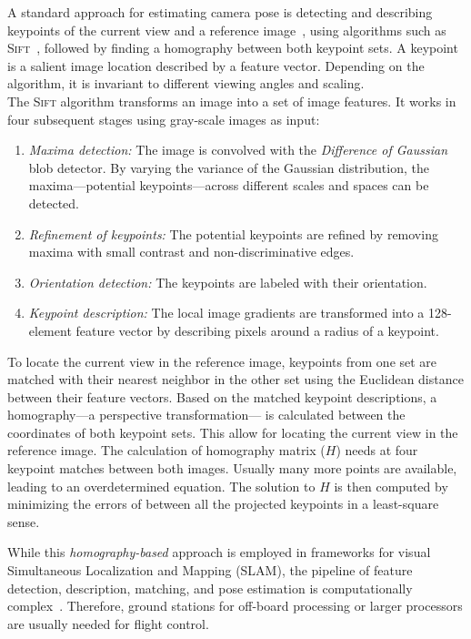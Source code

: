 \documentclass{report}
\begin{document}
A standard approach for estimating camera pose is detecting and
describing keypoints of the current view and a reference
image~\cite{se2002global}, using algorithms such as
\textsc{Sift}~\cite{lowe1999object}, followed by finding a homography
between both keypoint sets. A keypoint is a salient image location
described by a feature vector. Depending on the algorithm, it is
invariant to different viewing angles and scaling.\\
The \textsc{Sift} algorithm transforms an image into a set of image
features. It works in four subsequent stages using gray-scale images
as input:
\begin{enumerate}
\item \emph{Maxima detection:} The image is convolved with the
  \emph{Difference of Gaussian} blob detector. By varying the variance
  of the Gaussian distribution, the maxima---potential
  keypoints---across different scales and spaces can be detected.
\item \emph{Refinement of keypoints:} The potential keypoints are
  refined by removing maxima with small contrast and non-discriminative
  edges.
\item \emph{Orientation detection:} The keypoints are labeled with
  their orientation.
\item \emph{Keypoint description:} The local image gradients are
  transformed into a 128-element feature vector by describing pixels
  around a radius of a keypoint.
\end{enumerate}

To locate the current view in the reference image, keypoints from one
set are matched with their nearest neighbor in the other set using the
Euclidean distance between their feature vectors. Based on the matched
keypoint descriptions, a homography---a perspective transformation---
is calculated between the coordinates of both keypoint sets. This
allow for locating the current view in the reference image. The
calculation of homography matrix ($H$) needs at four keypoint matches
between both images. Usually many more points are available, leading
to an overdetermined equation. The solution to $H$ is then computed by
minimizing the errors of between all the projected keypoints in a
least-square sense.

While this \emph{homography-based} approach is employed in frameworks
for visual Simultaneous Localization and Mapping (SLAM), the pipeline
of feature detection, description, matching, and pose estimation is
computationally complex~\cite{kendall2015posenet}. Therefore, ground
stations for off-board processing or larger processors are usually
needed for flight control.
\end{document}
